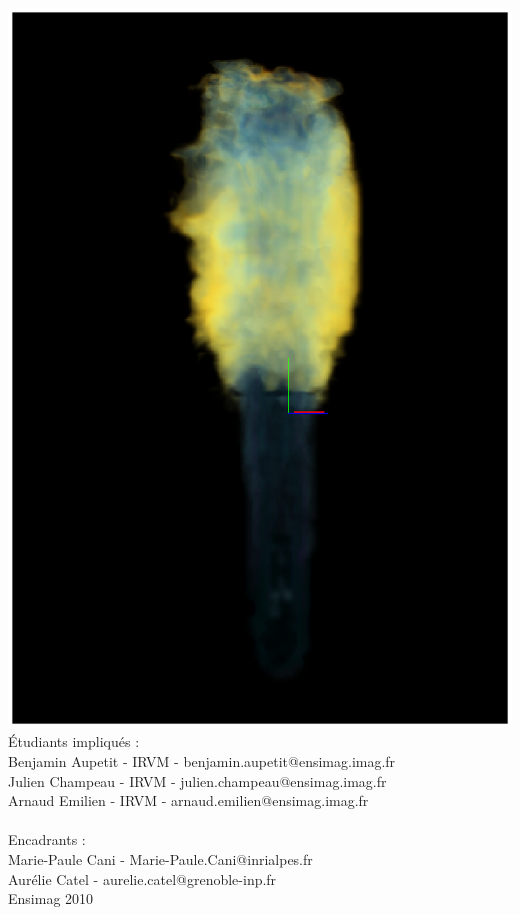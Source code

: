 \documentclass[a4paper,10pt]{article}
\begin{document}
\begin{center}
	\includegraphics[scale=0.4]{FlammeBleue.ps}\\
	\vspace{2cm}
	Étudiants impliqués :\\
	Benjamin Aupetit - IRVM - benjamin.aupetit@ensimag.imag.fr\\
	Julien Champeau - IRVM - julien.champeau@ensimag.imag.fr\\
	Arnaud Emilien - IRVM - arnaud.emilien@ensimag.imag.fr\\
	~\\
	Encadrants :\\
	Marie-Paule Cani  -  Marie-Paule.Cani@inrialpes.fr \\
	Aurélie Catel - aurelie.catel@grenoble-inp.fr
	~ \\
	\vspace{3mm}
	Ensimag 2010\\

\end{center}
\end{document}
